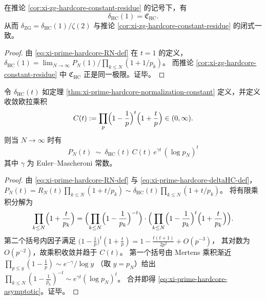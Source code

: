 \begin{corollary}[\texorpdfstring{$t=1$}{t=1} 与 \texorpdfstring{$\mathfrak C_{\mathrm{HC}}$}{C_HC} 的一致性]\label{cor:xi-prime-hardcore-deltaHC-matches-C_HC}
在推论 \ref{cor:xi-zg-hardcore-constant-residue} 的记号下，有
\[
\delta_{\mathrm{HC}}(1)=\mathfrak C_{\mathrm{HC}}.
\]
从而
\(
\delta_{\mathrm{ZG}}=\delta_{\mathrm{HC}}(1)/\zeta(2)
\)
与推论 \ref{cor:xi-zg-hardcore-constant-residue} 的闭式一致。
\end{corollary}
\begin{proof}
由 \eqref{eq:xi-prime-hardcore-RN-def} 在 \(t=1\) 的定义，\(\delta_{\mathrm{HC}}(1)=\lim_{N\to\infty}P_N(1)/\prod_{k\le N}(1+1/p_k)\)。
而推论 \ref{cor:xi-zg-hardcore-constant-residue} 中 \(\mathfrak C_{\mathrm{HC}}\) 正是同一极限。证毕。
\end{proof}

\begin{theorem}\label{thm:xi-prime-hardcore-mertens-leyang-asymptotic}
令 \(\delta_{\mathrm{HC}}(t)\) 如定理 \ref{thm:xi-prime-hardcore-normalization-constant} 定义，并定义收敛欧拉乘积
\begin{equation}\label{eq:xi-prime-hardcore-Ct-euler}
C(t):=\prod_{p}\Bigl(1-\frac{1}{p}\Bigr)^{t}\Bigl(1+\frac{t}{p}\Bigr)\in(0,\infty).
\end{equation}
则当 \(N\to\infty\) 时有
\begin{equation}\label{eq:xi-prime-hardcore-asymptotic}
\boxed{\;
P_N(t)\ \sim\ \delta_{\mathrm{HC}}(t)\,C(t)\,e^{\gamma t}\,(\log p_N)^{t}\;}
\end{equation}
其中 \(\gamma\) 为 Euler--Mascheroni 常数。
\end{theorem}
\begin{proof}
由 \eqref{eq:xi-prime-hardcore-RN-def} 与 \eqref{eq:xi-prime-hardcore-deltaHC-def}，
\(
P_N(t)=R_N(t)\prod_{k\le N}(1+t/p_k)\sim \delta_{\mathrm{HC}}(t)\prod_{k\le N}(1+t/p_k)
\)。
将有限乘积分解为
\[
\prod_{k\le N}\Bigl(1+\frac{t}{p_k}\Bigr)
=
\Bigl(\prod_{k\le N}\Bigl(1-\frac{1}{p_k}\Bigr)^{-t}\Bigr)
\cdot
\Bigl(\prod_{k\le N}\Bigl(1-\frac{1}{p_k}\Bigr)^t\Bigl(1+\frac{t}{p_k}\Bigr)\Bigr).
\]
第二个括号内因子满足
\(
\bigl(1-\frac1p\bigr)^t(1+\frac{t}{p})
=1-\frac{t(t+1)}{2p^2}+O(p^{-3})
\)，
其对数为 \(O(p^{-2})\)，故乘积收敛并趋于 \(C(t)\)。
第一个括号由 Mertens 乘积渐近
\(
\prod_{p\le y}(1-\frac1p)\sim e^{-\gamma}/\log y
\)
（取 \(y=p_N\)）给出
\(
\prod_{k\le N}(1-\frac1{p_k})^{-t}\sim e^{\gamma t}(\log p_N)^t
\)。
合并即得 \eqref{eq:xi-prime-hardcore-asymptotic}。证毕。
\end{proof}

